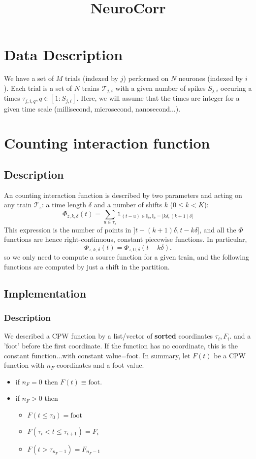 \documentclass{revtex4}
\begin{document}
\title{NeuroCorr}
\maketitle

\section{Data Description}
We have a set of $M$ trials (indexed by $j$) performed on $N$ neurones (indexed by $i$).
Each trial is a set of $N$ trains $\mathcal{T}_{j,i}$ with a
given number of spikes $S_{j,i}$ occuring a times $\tau_{j,i,q}, q\in[1:S_{j,i}]$.
Here, we will assume that the times are integer for a given time scale (millisecond, microsecond, nanosecond...).

\section{Counting interaction function}
\subsection{Description}
An counting interaction function is described by two parameters and acting on any train $\mathcal{T}_z$: a time length $\delta$ and a number
of shifts $k$ ($0\leq k < K$):
$$
	\Phi_{z,k,\delta}(t) = 
	\sum_{u\in\tau_{z}}
	 \mathds{1}_{(t-u)\in\mathbb{I}_k,\mathbb{I}_k=\lbrack k\delta,(k+1)\delta\lbrack}
$$
This expression is the number of points in $\rbrack t-(k+1)\delta,t-k\delta\rbrack$, and all the $\Phi$ functions
are hence right-continuous, constant piecewise functions.
In particular,
$$
	\Phi_{z,k,\delta}(t) = \Phi_{z,0,\delta}(t-k\delta).
$$
so we only need to compute a source function for a given train, and the following functions are computed by just
a shift in the partition.

\subsection{Implementation}
\subsubsection{Description}
We described a CPW function by a list/vector of \textbf{sorted} coordinates $\tau_i,F_i$.
and a '$\mathrm{foot}$' before the first coordinate. If the function has no coordinate, this
is the constant function...with constant value=$\mathrm{foot}$.
In summary, let $F(t)$ be a CPW function with $n_F$  coordinates and a foot value.
\begin{itemize}
	\item if $n_F=0$ then $F(t)\equiv\mathrm{foot}$.
	\item if $n_F>0$ then
	\begin{itemize}
		\item $F(t\leq\tau_0) = \mathrm{foot}$
		\item $F(\tau_{i}<t\leq\tau_{i+1}) = F_i$
		\item $F(t>\tau_{n_F-1})           = F_{n_F-1}$
	\end{itemize}
\end{itemize}
\end{document}
